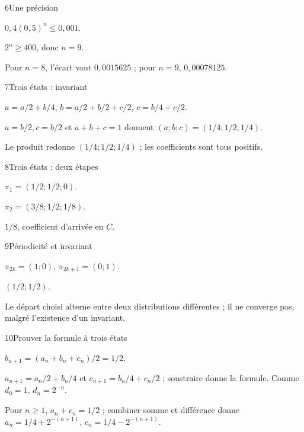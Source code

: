 \begin{corrige}{6}{Une précision}
\begin{questions}
\item $0{,}4(0{,}5)^n\leq0{,}001$.
\item $2^n\geq400$, donc $n=9$.
\item Pour $n=8$, l’écart vaut $0{,}0015625$ ; pour $n=9$, $0{,}00078125$.
\end{questions}
\end{corrige}
\begin{corrige}{7}{Trois états : invariant}
\begin{questions}
\item $a=a/2+b/4$, $b=a/2+b/2+c/2$, $c=b/4+c/2$.
\item $a=b/2,c=b/2$ et $a+b+c=1$ donnent $(a;b;c)=(1/4;1/2;1/4)$.
\item Le produit redonne $(1/4;1/2;1/4)$ ; les coefficients sont tous positifs.
\end{questions}
\end{corrige}
\begin{corrige}{8}{Trois états : deux étapes}
\begin{questions}
\item $\pi_1=(1/2;1/2;0)$.
\item $\pi_2=(3/8;1/2;1/8)$.
\item $1/8$, coefficient d’arrivée en $C$.
\end{questions}
\end{corrige}
\begin{corrige}{9}{Périodicité et invariant}
\begin{questions}
\item $\pi_{2k}=(1;0)$, $\pi_{2k+1}=(0;1)$.
\item $(1/2;1/2)$.
\item Le départ choisi alterne entre deux distributions différentes ; il ne converge pas, malgré l’existence d’un invariant.
\end{questions}
\end{corrige}
\begin{corrige}{10}{Prouver la formule à trois états}
\begin{questions}
\item $b_{n+1}=(a_n+b_n+c_n)/2=1/2$.
\item $a_{n+1}=a_n/2+b_n/4$ et $c_{n+1}=b_n/4+c_n/2$ ; soustraire donne la formule. Comme $d_0=1$, $d_n=2^{-n}$.
\item Pour $n\geq1$, $a_n+c_n=1/2$ ; combiner somme et différence donne $a_n=1/4+2^{-(n+1)}$, $c_n=1/4-2^{-(n+1)}$.
\end{questions}
\end{corrige}
